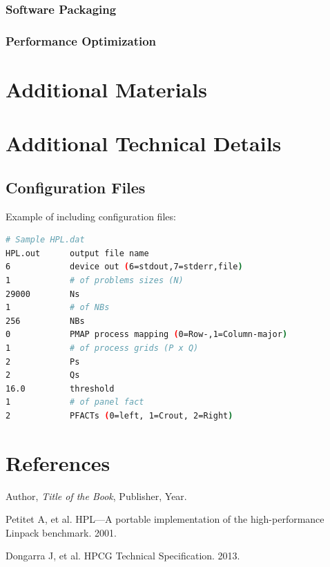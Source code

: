 \documentclass[a4paper,12pt]{article}
\begin{document}
\subsubsection{Software Packaging}

\subsubsection{Performance Optimization}

\newpage

\section{Additional Materials}

\newpage

\appendix
\section{Additional Technical Details}
\subsection{Configuration Files}
Example of including configuration files:

\begin{lstlisting}[language=bash, caption=HPL Configuration File]
# Sample HPL.dat
HPL.out      output file name
6            device out (6=stdout,7=stderr,file)
1            # of problems sizes (N)
29000        Ns
1            # of NBs
256          NBs
0            PMAP process mapping (0=Row-,1=Column-major)
1            # of process grids (P x Q)
2            Ps
2            Qs
16.0         threshold
1            # of panel fact
2            PFACTs (0=left, 1=Crout, 2=Right)
\end{lstlisting}

\newpage

\section{References}
\begin{thebibliography}{9}
Author, \textit{Title of the Book}, Publisher, Year.

Petitet A, et al. HPL—A portable implementation of the high-performance Linpack benchmark. 2001.

Dongarra J, et al. HPCG Technical Specification. 2013.
\end{thebibliography}

\newpage
\end{document}
